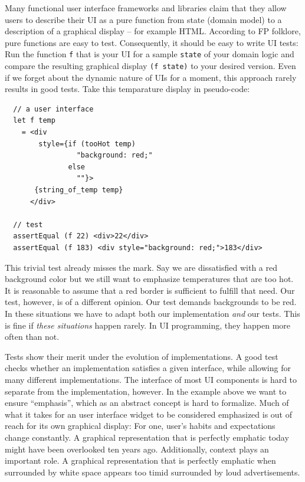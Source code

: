 \documentclass[sigplan,screen]{acmart}
\begin{document}
Many functional user interface frameworks and libraries claim that
they allow users to describe their UI as a pure function from state
(domain model) to a description of a graphical display -- for example
HTML. According to FP folklore, pure functions are easy to
test. Consequently, it should be easy to write UI tests: Run the
function \texttt{f} that is your UI for a sample \texttt{state} of
your domain logic and compare the resulting graphical display
\texttt{(f state)} to your desired version. Even if we forget about
the dynamic nature of UIs for a moment, this approach rarely results
in good tests. Take this temparature display in pseudo-code:
%
\begin{verbatim}
  // a user interface
  let f temp
    = <div
        style={if (tooHot temp)
                 "background: red;"
               else
                 ""}>
       {string_of_temp temp}
      </div>

  // test
  assertEqual (f 22) <div>22</div>
  assertEqual (f 183) <div style="background: red;">183</div>
\end{verbatim}
%
This trivial test already misses the mark. Say we are dissatisfied
with a red background color but we still want to emphasize
temperatures that are too hot. It is reasonable to assume that a red
border is sufficient to fulfill that need. Our test, however, is of a
different opinion. Our test demands backgrounds to be red. In these
situations we have to adapt both our implementation \textit{and} our
tests. This is fine if \textit{these situations} happen rarely. In UI
programming, they happen more often than not.

Tests show their merit under the evolution of implementations. A good
test checks whether an implementation satisfies a given interface,
while allowing for many different implementations. The interface of
most UI components is hard to separate from the implementation,
however. In the example above we want to ensure ``emphasis'', which as
an abstract concept is hard to formalize. Much of what it takes for an
user interface widget to be considered emphasized is out of reach for
its own graphical display: For one, user's habits and expectations
change constantly. A graphical representation that is perfectly
emphatic today might have been overlooked ten years ago. Additionally,
context plays an important role. A graphical representation that is
perfectly emphatic when surrounded by white space appears too timid
surrounded by loud advertisements.
\end{document}
